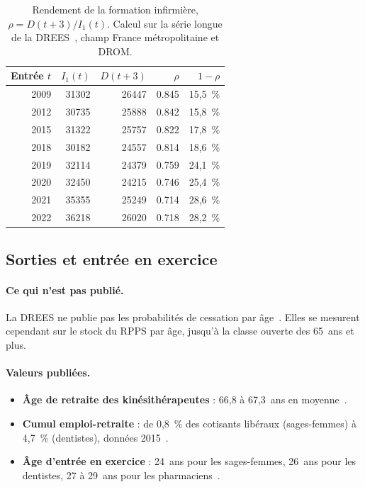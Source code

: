\begin{table}[htbp]
\centering\small
\caption{Rendement de la formation infirmière, $\rho = D(t+3)/I_1(t)$. Calcul\mesure{} sur la série longue de la DREES~\cite{a1-drees491}, champ France métropolitaine et DROM.}\label{a1-tab:rho}
\begin{tabular}{rrrrr}
\toprule
Entrée $t$ & $I_1(t)$ & $D(t+3)$ & $\rho$ & $1-\rho$ \\
\midrule
2009 & \num{31302} & \num{26447} & \num{0.845} & 15,5~\% \\
2012 & \num{30735} & \num{25888} & \num{0.842} & 15,8~\% \\
2015 & \num{31322} & \num{25757} & \num{0.822} & 17,8~\% \\
2018 & \num{30182} & \num{24557} & \num{0.814} & 18,6~\% \\
2019 & \num{32114} & \num{24379} & \num{0.759} & 24,1~\% \\
2020 & \num{32450} & \num{24215} & \num{0.746} & 25,4~\% \\
2021 & \num{35355} & \num{25249} & \num{0.714} & 28,6~\% \\
2022 & \num{36218} & \num{26020} & \num{0.718} & 28,2~\% \\
\bottomrule
\end{tabular}
\end{table}

\subsection{Sorties et entrée en exercice}

\paragraph{Ce qui n'est pas publié.}
La DREES ne publie pas les probabilités de cessation par âge~\cite{a1-dd76}.
Elles se mesurent cependant sur le stock du RPPS par âge, jusqu'à la classe
ouverte des 65~ans et plus.

\paragraph{Valeurs publiées.}
\begin{itemize}
\item \textbf{Âge de retraite des kinésithérapeutes} : 66,8 à 67,3~ans en
  moyenne~\cite{a1-cnomk2024}.
\item \textbf{Cumul emploi-retraite} : de 0,8~\%\derive{} des cotisants
  libéraux (sages-femmes) à 4,7~\%\derive{} (dentistes), données
  2015~\cite{a1-cor2016}.
\item \textbf{Âge d'entrée en exercice} : 24~ans pour les sages-femmes,
  26~ans pour les dentistes, 27 à 29~ans pour les pharmaciens~\cite{a1-dd76}.
\end{itemize}

